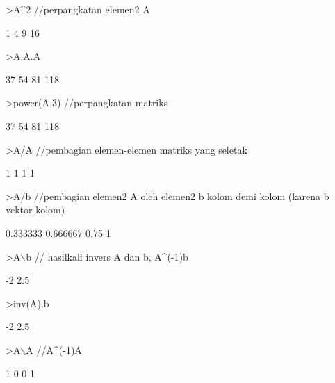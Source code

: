\documentclass{article}
\newenvironment{eulernotebook}{\par}{\par}
\newenvironment{eulercomment}{\par\medskip}{\par\medskip}
\begin{document}
\begin{eulernotebook}
\begin{eulercomment}
\begin{eulercomment}
\begin{eulercomment}
\begin{eulercomment}
\begin{eulerprompt}
>A^2 //perpangkatan elemen2 A
\end{eulerprompt}
\begin{euleroutput}
              1             4 
              9            16 
\end{euleroutput}
\begin{eulerprompt}
>A.A.A
\end{eulerprompt}
\begin{euleroutput}
             37            54 
             81           118 
\end{euleroutput}
\begin{eulerprompt}
>power(A,3) //perpangkatan matriks
\end{eulerprompt}
\begin{euleroutput}
             37            54 
             81           118 
\end{euleroutput}
\begin{eulerprompt}
>A/A //pembagian elemen-elemen matriks yang seletak
\end{eulerprompt}
\begin{euleroutput}
              1             1 
              1             1 
\end{euleroutput}
\begin{eulerprompt}
>A/b //pembagian elemen2 A oleh elemen2 b kolom demi kolom (karena b vektor kolom)
\end{eulerprompt}
\begin{euleroutput}
       0.333333      0.666667 
           0.75             1 
\end{euleroutput}
\begin{eulerprompt}
>A\(\backslash\)b // hasilkali invers A dan b, A^(-1)b 
\end{eulerprompt}
\begin{euleroutput}
             -2 
            2.5 
\end{euleroutput}
\begin{eulerprompt}
>inv(A).b
\end{eulerprompt}
\begin{euleroutput}
             -2 
            2.5 
\end{euleroutput}
\begin{eulerprompt}
>A\(\backslash\)A   //A^(-1)A
\end{eulerprompt}
\begin{euleroutput}
              1             0 
              0             1 
\end{euleroutput}

\end{eulercomment}
\end{eulercomment}
\end{eulercomment}
\end{eulercomment}
\end{eulernotebook}
\end{document}
